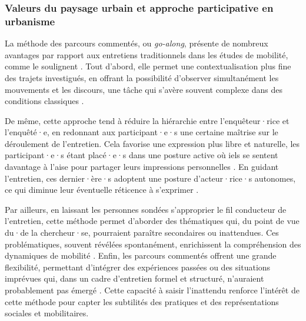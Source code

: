 \begin{refsegment}
\subsubsection*{Valeurs du paysage urbain et approche participative en urbanisme
    \label{chap3:parcours-commente-definition-generale}
    }

La méthode des parcours commentés, ou \textsl{go-along}, présente de nombreux avantages par rapport aux entretiens traditionnels dans les études de mobilité, comme le soulignent \textcolor{blue}{\textcite[3]{despres_replacer_2019}}. Tout d’abord, elle permet une contextualisation plus fine des trajets investigués, en offrant la possibilité d’observer simultanément les mouvements et les discours, une tâche qui s’avère souvent complexe dans des conditions classiques \textcolor{blue}{\autocite[119]{bergeron_uncovering_2014}}.%

De même, cette approche tend à réduire la hiérarchie entre l’enquêteur·rice et l’enquêté·e, en redonnant aux participant·e·s une certaine maîtrise sur le déroulement de l’entretien. Cela favorise une expression plus libre et naturelle, les participant·e·s étant placé·e·s dans une posture active où iels se sentent davantage à l’aise pour partager leurs impressions personnelles \textcolor{blue}{\autocite[120]{bergeron_uncovering_2014}}. En guidant l'entretien, ces dernier·ère·s adoptent une posture d’acteur·rice·s autonomes, ce qui diminue leur éventuelle réticence à s’exprimer \textcolor{blue}{\autocites[264]{carpiano_come_2009}[850]{evans_walking_2011}}.%

Par ailleurs, en laissant les personnes sondées s’approprier le fil conducteur de l’entretien, cette méthode permet d’aborder des thématiques qui, du point de vue du·de la chercheur·se, pourraient paraître secondaires ou inattendues. Ces problématiques, souvent révélées spontanément, enrichissent la compréhension des dynamiques de mobilité \textcolor{blue}{\autocite[463]{kusenbach_street_2003}}. Enfin, les parcours commentés offrent une grande flexibilité, permettant d’intégrer des expériences passées ou des situations imprévues qui, dans un cadre d’entretien formel et structuré, n’auraient probablement pas émergé \textcolor{blue}{\autocite[464]{kusenbach_street_2003}}. Cette capacité à saisir l’inattendu renforce l’intérêt de cette méthode pour capter les subtilités des pratiques et des représentations sociales et mobilitaires.%


\end{refsegment}
